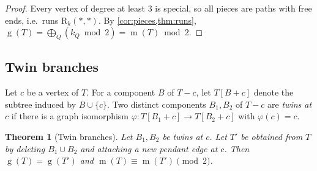 \documentclass[11pt]{amsart}
\newtheorem{theorem}{Theorem}[section]
\theoremstyle{definition}
\theoremstyle{remark}
\newcommand{\gv}{\operatorname{g}}           %
\newcommand{\m}{\operatorname{m}}
\newcommand{\R}{\mathrm{R}}
\newcommand{\free}{\ast}
\begin{document}
\begin{proof}
Every vertex of degree at least $3$ is special, so all pieces are paths with free ends, i.e.\ runs $\R_k(\free,\free)$. By \cref{cor:pieces,thm:runs}, $\gv(T)=\bigoplus_Q (k_Q\bmod2)=\m(T)\bmod 2$.
\end{proof}

\subsection{Twin branches}
Let $c$ be a vertex of $T$. For a component $B$ of $T-c$, let $T[B+c]$ denote the subtree induced by $B\cup\{c\}$. Two distinct components $B_1,B_2$ of $T-c$ are \emph{twins at $c$} if there is a graph isomorphism $\varphi\colon T[B_1+c]\to T[B_2+c]$ with $\varphi(c)=c$.

\begin{theorem}[Twin branches]\label{thm:twin}
Let $B_1,B_2$ be twins at $c$. Let $T'$ be obtained from $T$ by deleting $B_1\cup B_2$ and attaching a new pendant edge at $c$. Then $\gv(T)=\gv(T')$ and $\m(T)\equiv\m(T')\pmod 2$.
\end{theorem}
\end{document}
